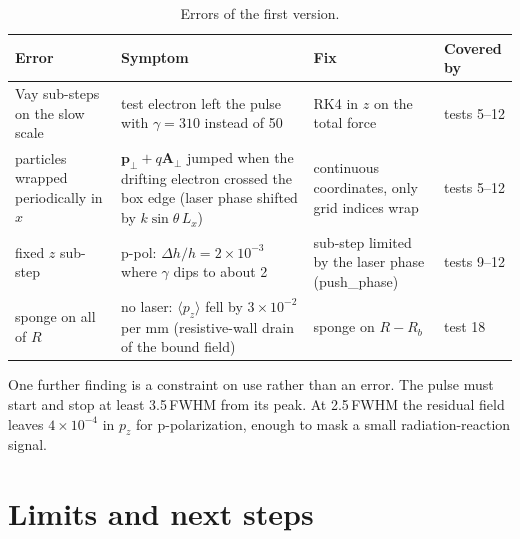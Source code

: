\documentclass[11pt,a4paper]{article}
\newcommand{\code}[1]{{\fontencoding{OT1}\fontfamily{cmtt}\selectfont #1}}
\begin{document}
\begin{table}[H]
\centering\small
\caption{Errors of the first version.}
\begin{tabularx}{\textwidth}{@{}L L L l@{}}
\toprule
Error & Symptom & Fix & Covered by\\
\midrule
Vay sub-steps on the slow scale & test electron left the pulse with $\gamma=310$ instead of 50 & RK4 in $z$ on the total force & tests 5--12\\
particles wrapped periodically in $x$ & $\bm p_\perp+q\bm A_\perp$ jumped when the drifting electron crossed the box edge (laser phase shifted by $k\sin\theta\,L_x$) & continuous coordinates, only grid indices wrap & tests 5--12\\
fixed $z$ sub-step & p-pol: $\Delta h/h=2\times10^{-3}$ where $\gamma$ dips to about 2 & sub-step limited by the laser phase (\code{push\_phase}) & tests 9--12\\
sponge on all of $R$ & no laser: $\langle p_z\rangle$ fell by $3\times10^{-2}$ per mm (resistive-wall drain of the bound field) & sponge on $R-R_b$ & test 18\\
\bottomrule
\end{tabularx}
\end{table}

One further finding is a constraint on use rather than an error. The pulse must start and stop at least 3.5\,FWHM from its peak. At 2.5\,FWHM the residual field leaves $4\times10^{-4}$ in $p_z$ for p-polarization, enough to mask a small radiation-reaction signal.

\section{Limits and next steps}
\end{document}
